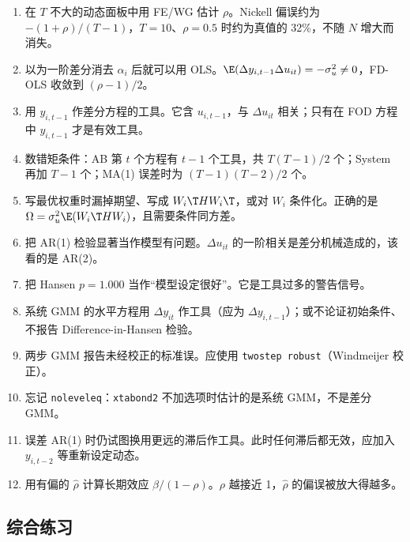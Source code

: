 \begin{enumerate}[label=(\arabic*)]
  \item 在 $T$ 不大的动态面板中用 FE/WG 估计 $\rho$。Nickell 偏误约为 $-(1+\rho)/(T-1)$，$T=10$、$\rho=0.5$ 时约为真值的 32\%，不随 $N$ 增大而消失。
  \item 以为一阶差分消去 $\alpha_i$ 后就可以用 OLS。$\E(\Delta y_{i,t-1}\Delta u_{it})=-\sigma_u^2\neq0$，FD-OLS 收敛到 $(\rho-1)/2$。
  \item 用 $y_{i,t-1}$ 作差分方程的工具。它含 $u_{i,t-1}$，与 $\Delta u_{it}$ 相关；只有在 FOD 方程中 $y_{i,t-1}$ 才是有效工具。
  \item 数错矩条件：AB 第 $t$ 个方程有 $t-1$ 个工具，共 $T(T-1)/2$ 个；System 再加 $T-1$ 个；MA(1) 误差时为 $(T-1)(T-2)/2$ 个。
  \item 写最优权重时漏掉期望、写成 $W_i\T HW_i\T$，或对 $W_i$ 条件化。正确的是 $\Omega=\sigma_u^2\E(W_i\T HW_i)$，且需要条件同方差。
  \item 把 AR(1) 检验显著当作模型有问题。$\Delta u_{it}$ 的一阶相关是差分机械造成的，该看的是 AR(2)。
  \item 把 Hansen $p=1.000$ 当作“模型设定很好”。它是工具过多的警告信号。
  \item 系统 GMM 的水平方程用 $\Delta y_{it}$ 作工具（应为 $\Delta y_{i,t-1}$）；或不论证初始条件、不报告 Difference-in-Hansen 检验。
  \item 两步 GMM 报告未经校正的标准误。应使用 \texttt{twostep robust}（Windmeijer 校正）。
  \item 忘记 \texttt{noleveleq}：\texttt{xtabond2} 不加选项时估计的是系统 GMM，不是差分 GMM。
  \item 误差 AR(1) 时仍试图换用更远的滞后作工具。此时任何滞后都无效，应加入 $y_{i,t-2}$ 等重新设定动态。
  \item 用有偏的 $\hat\rho$ 计算长期效应 $\beta/(1-\rho)$。$\rho$ 越接近 1，$\hat\rho$ 的偏误被放大得越多。
\end{enumerate}

\subsection{综合练习}

